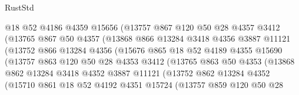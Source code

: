 \begin{lexlean}{RustStd}
\begin{coremodule}
                      @18
                      @52
                      @4186
                      @4359
                      @15656
                      (@13757
                        @867
                        @120
                        @50
                        @28
                        @4357
                        @3412
                        (@13765
                          @867
                          @50
                          @4357
                          (@13868
                            @866
                            @13284
                            @3418
                            @4356
                            @3887
                            @11121
                            (@13752
                              @866
                              @13284
                              @4356
                              (@15676
                                @865
                                @18
                                @52
                                @4189
                                @4355
                                @15690
                                (@13757
                                  @863
                                  @120
                                  @50
                                  @28
                                  @4353
                                  @3412
                                  (@13765
                                    @863
                                    @50
                                    @4353
                                    (@13868
                                      @862
                                      @13284
                                      @3418
                                      @4352
                                      @3887
                                      @11121
                                      (@13752
                                        @862
                                        @13284
                                        @4352
                                        (@15710
                                          @861
                                          @18
                                          @52
                                          @4192
                                          @4351
                                          @15724
                                          (@13757
                                            @859
                                            @120
                                            @50
                                            @28

\end{coremodule}
\end{lexlean}

